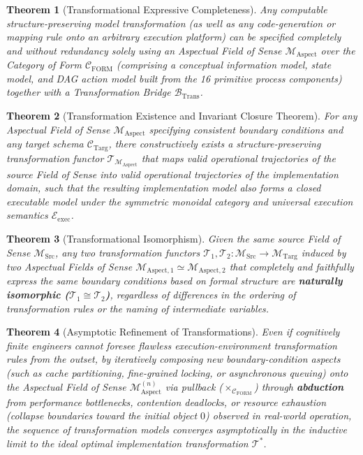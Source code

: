 \documentclass[11pt,a4paper]{article}
\theoremstyle{definition}
\theoremstyle{plain}
\newtheorem{theorem}{Theorem}[section]
\theoremstyle{remark}
\newcommand{\CFORM}{\mathcal{C}_{\mathrm{FORM}}}
\newcommand{\CTarg}{\mathcal{C}_{\mathrm{Targ}}}
\newcommand{\MSrc}{\mathcal{M}_{\mathrm{Src}}}
\newcommand{\MTarg}{\mathcal{M}_{\mathrm{Targ}}}
\newcommand{\MAspect}{\mathcal{M}_{\mathrm{Aspect}}}
\newcommand{\BTrans}{\mathcal{B}_{\mathrm{Trans}}}
\newcommand{\Eexec}{\mathcal{E}_{\mathrm{exec}}}
\begin{document}
\begin{theorem}[Transformational Expressive Completeness]\label{thm:trans-completeness}
Any computable structure-preserving model transformation (as well as any code-generation or mapping rule onto an arbitrary execution platform) can be specified completely and without redundancy solely using an Aspectual Field of Sense $\MAspect$ over the Category of Form $\CFORM$ (comprising a conceptual information model, state model, and DAG action model built from the 16 primitive process components) together with a Transformation Bridge $\BTrans$.
\end{theorem}

\begin{theorem}[Transformation Existence and Invariant Closure Theorem]\label{thm:trans-existence}
For any Aspectual Field of Sense $\MAspect$ specifying consistent boundary conditions and any target schema $\CTarg$, there constructively exists a structure-preserving transformation functor $\mathcal{T}_{\MAspect}$ that maps valid operational trajectories of the source Field of Sense into valid operational trajectories of the implementation domain, such that the resulting implementation model also forms a closed executable model under the symmetric monoidal category and universal execution semantics $\Eexec$.
\end{theorem}

\begin{theorem}[Transformational Isomorphism]\label{thm:trans-isomorphism}
Given the same source Field of Sense $\MSrc$, any two transformation functors $\mathcal{T}_1, \mathcal{T}_2 : \MSrc \to \MTarg$ induced by two Aspectual Fields of Sense $\mathcal{M}_{\mathrm{Aspect}, 1} \simeq \mathcal{M}_{\mathrm{Aspect}, 2}$ that completely and faithfully express the same boundary conditions based on formal structure are \textbf{naturally isomorphic ($\mathcal{T}_1 \cong \mathcal{T}_2$)}, regardless of differences in the ordering of transformation rules or the naming of intermediate variables.
\end{theorem}

\begin{theorem}[Asymptotic Refinement of Transformations]\label{thm:trans-asymptotic}
Even if cognitively finite engineers cannot foresee flawless execution-environment transformation rules from the outset, by iteratively composing new boundary-condition aspects (such as cache partitioning, fine-grained locking, or asynchronous queuing) onto the Aspectual Field of Sense $\MAspect^{(n)}$ via pullback ($\times_{\CFORM}$) through \textbf{abduction} from performance bottlenecks, contention deadlocks, or resource exhaustion (collapse boundaries toward the initial object $0$) observed in real-world operation, the sequence of transformation models converges asymptotically in the inductive limit to the ideal optimal implementation transformation $\mathcal{T}^*$.
\end{theorem}
\end{document}

